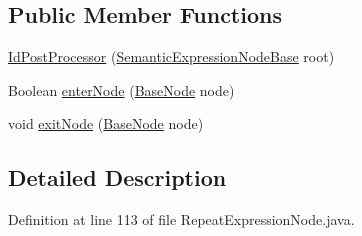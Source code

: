 \subsection*{Public Member Functions}
\begin{DoxyCompactItemize}
\item 
\hyperlink{classit_1_1emarolab_1_1cagg_1_1core_1_1language_1_1syntax_1_1expressionTree_1_1expressionNodeTypee265c5385dc11a583b6493cfac9b7ab_ab32457ff3da036ff5c1748264dd4f864}{Id\-Post\-Processor} (\hyperlink{classit_1_1emarolab_1_1cagg_1_1core_1_1evaluation_1_1semanticGrammar_1_1syntaxCompiler_1_1Semantec1f2fc886c35d505e2bc10592e2dff6}{Semantic\-Expression\-Node\-Base} root)
\item 
Boolean \hyperlink{classit_1_1emarolab_1_1cagg_1_1core_1_1language_1_1syntax_1_1expressionTree_1_1expressionNodeTypee265c5385dc11a583b6493cfac9b7ab_a600fdcbe09aaf27e9bacb2562b1bfdc2}{enter\-Node} (\hyperlink{classit_1_1emarolab_1_1cagg_1_1core_1_1BaseNode}{Base\-Node} node)
\item 
void \hyperlink{classit_1_1emarolab_1_1cagg_1_1core_1_1language_1_1syntax_1_1expressionTree_1_1expressionNodeTypee265c5385dc11a583b6493cfac9b7ab_a6d97ddda2078ce92711cbec1120d08f2}{exit\-Node} (\hyperlink{classit_1_1emarolab_1_1cagg_1_1core_1_1BaseNode}{Base\-Node} node)
\end{DoxyCompactItemize}


\subsection{Detailed Description}


Definition at line 113 of file Repeat\-Expression\-Node.\-java.



